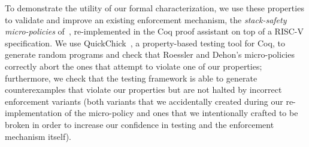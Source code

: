 \documentclass[acmsmall,review,anonymous]{acmart}\settopmatter{printfolios=true,printccs=false,printacmref=false}
\begin{document}

To demonstrate the utility of our formal characterization, we use these
properties to validate and improve an existing enforcement mechanism, the
{\em stack-safety micro-policies} of~\citet{DBLP:conf/sp/RoesslerD18}, re-implemented
in the Coq proof assistant on top of a RISC-V specification.  We
use QuickChick~\citep{Denes:VSL2014,Pierce:SF4}, a property-based testing
tool for Coq, to generate random programs and check
that Roessler and Dehon's micro-policies correctly abort the ones that
attempt to violate one of our properties; furthermore, we
%
check that the testing framework is able to generate counterexamples
that violate our properties but are not halted by incorrect
enforcement variants (both variants that we accidentally created
during our re-implementation of the micro-policy and ones that we
intentionally crafted to be broken in order to increase our confidence
in testing and the enforcement mechanism itself).
\end{document}

